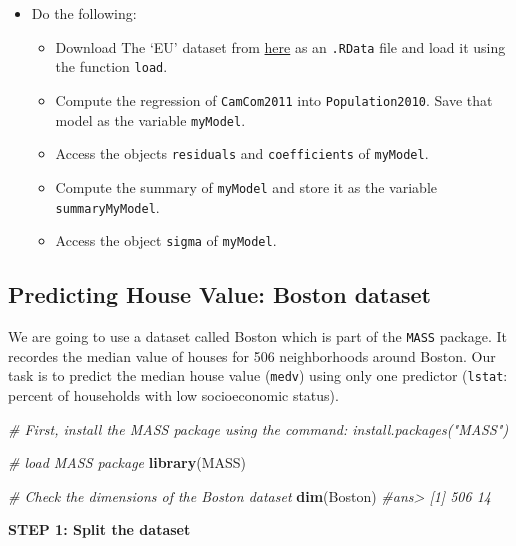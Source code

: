 \documentclass[]{book}
\newenvironment{Shaded}{\begin{snugshade}}{\end{snugshade}}
\newcommand{\KeywordTok}[1]{\textcolor[rgb]{0.13,0.29,0.53}{\textbf{{#1}}}}
\newcommand{\CommentTok}[1]{\textcolor[rgb]{0.56,0.35,0.01}{\textit{{#1}}}}
\newcommand{\NormalTok}[1]{{#1}}
\providecommand{\tightlist}{%
  \setlength{\itemsep}{0pt}\setlength{\parskip}{0pt}}
\newenvironment{rmdblock}[1]
  {\begin{shaded*}
  \begin{itemize}
  \renewcommand{\labelitemi}{
    \raisebox{-.7\height}[0pt][0pt]{
      {\setkeys{Gin}{width=2em,keepaspectratio}\texttt{[image: img/icons/\#1]}}
    }
  }
  \item
  }
  {
  \end{itemize}
  \end{shaded*}
  }
\newenvironment{rmdexercise}
  {\begin{rmdblock}{exercise}}
  {\end{rmdblock}}
\begin{document}
\begin{rmdexercise}
Do the following:

\begin{itemize}
\tightlist
\item
  Download The `EU' dataset from \href{datasets/EU.RData}{here} as an
  \texttt{.RData} file and load it using the function \texttt{load}.
\item
  Compute the regression of \texttt{CamCom2011} into
  \texttt{Population2010}. Save that model as the variable
  \texttt{myModel}.
\item
  Access the objects \texttt{residuals} and \texttt{coefficients} of
  \texttt{myModel}.
\item
  Compute the summary of \texttt{myModel} and store it as the variable
  \texttt{summaryMyModel}.
\item
  Access the object \texttt{sigma} of \texttt{myModel}.
\end{itemize}
\end{rmdexercise}

\subsection{Predicting House Value: Boston
dataset}\label{predicting-house-value-boston-dataset}

We are going to use a dataset called Boston which is part of the
\texttt{MASS} package. It recordes the median value of houses for 506
neighborhoods around Boston. Our task is to predict the median house
value (\texttt{medv}) using only one predictor (\texttt{lstat}: percent
of households with low socioeconomic status).

\begin{Shaded}
\begin{Highlighting}[]
\CommentTok{# First, install the MASS package using the command: install.packages("MASS")}

\CommentTok{# load MASS package}
\KeywordTok{library}\NormalTok{(MASS)}

\CommentTok{# Check the dimensions of the Boston dataset}
\KeywordTok{dim}\NormalTok{(Boston)}
\CommentTok{#ans> [1] 506  14}
\end{Highlighting}
\end{Shaded}

\textbf{STEP 1: Split the dataset}
\end{document}
